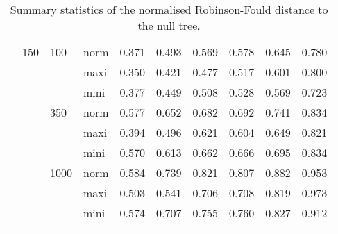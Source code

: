 \begin{longtable}{llllrrrrrr}
   & 150 & 100 & norm & 0.371 & 0.493 & 0.569 & 0.578 & 0.645 & 0.780 \\ 
   &  &  & maxi & 0.350 & 0.421 & 0.477 & 0.517 & 0.601 & 0.800 \\ 
   &  &  & mini & 0.377 & 0.449 & 0.508 & 0.528 & 0.569 & 0.723 \\ 
   &  & 350 & norm & 0.577 & 0.652 & 0.682 & 0.692 & 0.741 & 0.834 \\ 
   &  &  & maxi & 0.394 & 0.496 & 0.621 & 0.604 & 0.649 & 0.821 \\ 
   &  &  & mini & 0.570 & 0.613 & 0.662 & 0.666 & 0.695 & 0.834 \\ 
   &  & 1000 & norm & 0.584 & 0.739 & 0.821 & 0.807 & 0.882 & 0.953 \\ 
   &  &  & maxi & 0.503 & 0.541 & 0.706 & 0.708 & 0.819 & 0.973 \\ 
   &  &  & mini & 0.574 & 0.707 & 0.755 & 0.760 & 0.827 & 0.912 \\ 
   \hline
\hline
\caption{Summary statistics of the normalised Robinson-Fould distance to the null tree.} 
\label{Full_Tab_SummaryRFnull}
\end{longtable}
